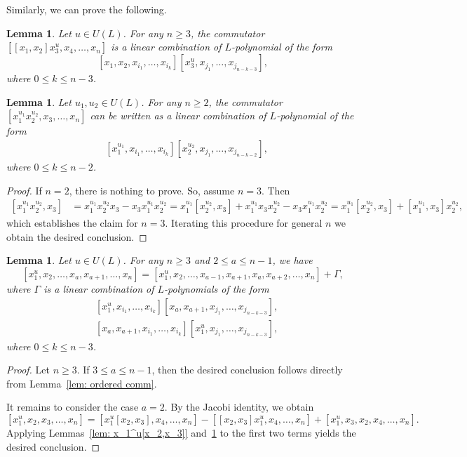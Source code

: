 \documentclass[a4paper,reqno]{amsart}
\newtheorem{lemma}[theorem]{Lemma}
\theoremstyle{definition}
\numberwithin{equation}{section}
\numberwithin{theorem}{section}
\begin{document}
Similarly, we can prove the following.

\begin{lemma}\label{lem: [x_1,x_2]x_3^u}
    Let $u\in U(L)$. For any $n\geq 3$, the commutator $[[x_1,x_2]x_3^u, x_4, \ldots , x_n]$ is
    a linear combination of $L$-polynomial of the form  $$[x_{1},x_2, x_{i_1},\dots,x_{i_k}][x_3^u, x_{j_1},\dots,x_{j_{n-k-3}}],$$ where $0\leq k\leq n-3$.
\end{lemma}



\begin{lemma}\label{lem: x_1^{u_1}x_2^{u_2}}
    Let $u_1, u_2\in U(L)$. For any $n\geq 2$, the commutator $[x_1^{u_{1}}x_2^{u_{2}}, x_3, \ldots, x_n]$ can be written as a linear combination of $L$-polynomial of the form 
    \begin{align*}
        &[x_{1}^{u_{1}},x_{i_1},\dots,x_{i_{k}}][x_{2}^{u_{2}},x_{j_1},\dots,x_{j_{n-k-2}}],
    \end{align*}
     where $0\leq k \leq n-2$. 
\end{lemma}
\begin{proof}
     If $n=2$, there is nothing to prove. So, assume $n=3$. Then
    \begin{equation*}
    \begin{split}
          [x_1^{u_1}x_2^{u_2},x_3]&= x_1^{u_1}x_2^{u_2}x_3- x_3x_1^{u_1}x_2^{u_2} = x_1^{u_1}[x_2^{u_2},x_3]+ x_1^{u_1} x_3x_2^{u_2}- x_3 x_1^{u_1}x_2^{u_2}=x_1^{u_1}[x_2^{u_2},x_3]+ [x_1^{u_1} ,x_3]x_2^{u_2},
    \end{split}
    \end{equation*}
    which establishes the claim for $n=3$.
    Iterating this procedure for general $n$ we obtain the desired conclusion.
\end{proof}


\begin{lemma}\label{lem: ordered comm x_1^u}
    Let $u\in U(L)$. For any $n\geq 3$ and $2\leq a \leq n-1$, we have
$$
[x_1^u,x_2,\ldots, x_a,x_{a+1}, \ldots, x_{n}]= [x_1^u,x_2,\ldots, x_{a-1}, x_{a+1},x_{a}, x_{a+2}, \ldots, x_{n}] + \Gamma,
$$
where $\Gamma$ is a linear combination of $L$-polynomials of the form
\begin{align*}
    &[x_1^u, x_{i_1}, \ldots, x_{i_k}][x_a, x_{a+1}, x_{j_1}, \ldots, x_{j_{n-k-3}}],\\
    &[x_a, x_{a+1}, x_{i_1}, \ldots, x_{i_k}][x_1^u, x_{j_1}, \ldots, x_{j_{n-k-3}}],
\end{align*}
where $0\leq k \leq n-3$.
\end{lemma}
\begin{proof}
    Let $n\geq 3$. If $3\leq  a \leq n-1$, then the desired conclusion follows directly from Lemma~\ref{lem: ordered comm}. 
    
    It remains to consider the case $a=2$. By the Jacobi identity, we obtain
    $$
    [x_1^u,x_2,x_3, \ldots, x_n]=[x_1^u[x_2,x_3],x_4,\ldots, x_n]- [[x_2,x_3]x_1^u,x_4, \ldots, x_n]+ [x_1^u,x_3,x_2,x_4,\ldots,x_n].
    $$
    Applying Lemmas~\ref{lem: x_1^u[x_2,x_3]} and~\ref{lem: [x_1,x_2]x_3^u} to the first two terms yields the desired conclusion.
\end{proof}
\end{document}
